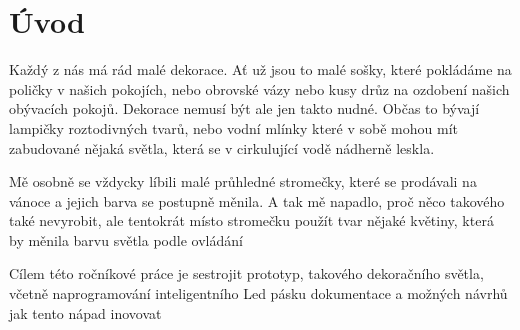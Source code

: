 \chapter*{Úvod}

Každý z nás má rád malé dekorace. Ať už jsou to malé sošky, které pokládáme na poličky v našich pokojích, nebo obrovské vázy nebo kusy drůz na ozdobení našich obývacích pokojů. Dekorace nemusí být ale jen takto nudné. Občas to bývají lampičky roztodivných tvarů, nebo vodní mlínky které v sobě mohou mít zabudované nějaká světla, která se v cirkulující vodě nádherně leskla.

Mě osobně se vždycky líbili malé průhledné stromečky, které se prodávali na vánoce a jejich barva se postupně měnila. A tak mě napadlo, proč něco takového také nevyrobit, ale tentokrát místo stromečku použít tvar nějaké květiny, která by měnila barvu světla podle ovládání  

Cílem této ročníkové práce je sestrojit prototyp, takového dekoračního světla, včetně naprogramování inteligentního Led pásku dokumentace a možných návrhů jak tento nápad inovovat


\newpage
